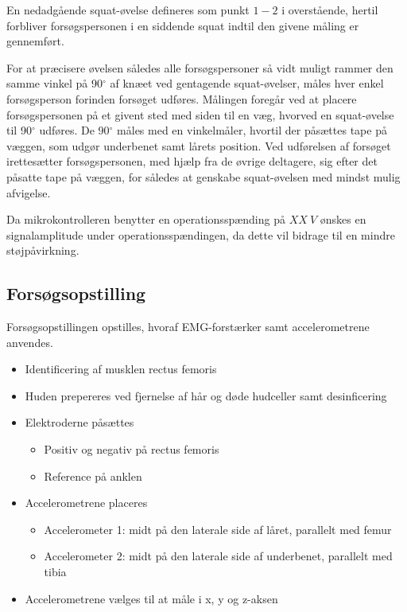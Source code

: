 En nedadgående squat-øvelse defineres som punkt $1-2$ i overstående, hertil forbliver forsøgspersonen i en siddende squat indtil den givene måling er gennemført.

For at præcisere øvelsen således alle forsøgspersoner så vidt muligt rammer den samme vinkel på 90$^{\circ}$ af knæet ved gentagende squat-øvelser, måles hver enkel forsøgsperson forinden forsøget udføres. Målingen foregår ved at placere forsøgspersonen på et givent sted med siden til en væg, hvorved en squat-øvelse til 90$^{\circ}$ udføres. De 90$^{\circ}$ måles med en vinkelmåler, hvortil der påsættes tape på væggen, som udgør underbenet samt lårets position.
Ved udførelsen af forsøget irettesætter forsøgspersonen, med hjælp fra de øvrige deltagere, sig efter det påsatte tape på væggen, for således at genskabe squat-øvelsen med mindst mulig afvigelse.

Da mikrokontrolleren benytter en operationsspænding på $XX~V$ ønskes en signalamplitude under operationsspændingen, da dette vil bidrage til en mindre støjpåvirkning. 



\subsection{Forsøgsopstilling}
Forsøgsopstillingen opstilles, hvoraf EMG-forstærker samt accelerometrene anvendes. 

\begin{itemize}
\item Identificering af musklen rectus femoris %
\item Huden prepereres ved fjernelse af hår og døde hudceller samt desinficering 
\item Elektroderne påsættes
	\begin{itemize}
	\item Positiv og negativ på rectus femoris
	\item Reference på anklen
	\end{itemize} 
\item Accelerometrene placeres 
	\begin{itemize}
	\item Accelerometer 1: midt på den laterale side af låret, parallelt med femur
	\item Accelerometer 2: midt på den laterale side af underbenet, parallelt med tibia 
	\end{itemize}
\item Accelerometrene vælges til at måle i x, y og z-aksen
\end{itemize}


